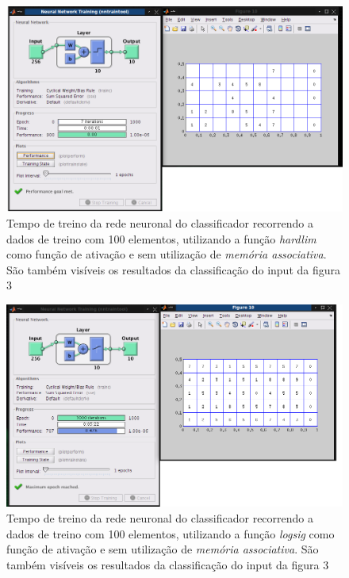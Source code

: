 \documentclass{article}
\begin{document}
\begin{figure}[h]
  \centering
      \includegraphics[scale=0.3]{100_Hardlim.png}
  \caption{Tempo de treino da rede neuronal do classificador recorrendo a dados de treino com 100 elementos, utilizando a função \emph{hardlim} como função de ativação e sem utilização de \emph{memória associativa}. São também visíveis os resultados da classificação do input da figura 3}
\end{figure}

\begin{figure}[h]
  \centering
      \includegraphics[scale=0.3]{100_Sigmoidal.png}
  \caption{Tempo de treino da rede neuronal do classificador recorrendo a dados de treino com 100 elementos, utilizando a função \emph{logsig} como função de ativação e sem utilização de \emph{memória associativa}. São também visíveis os resultados da classificação do input da figura 3}
\end{figure}
\end{document}
